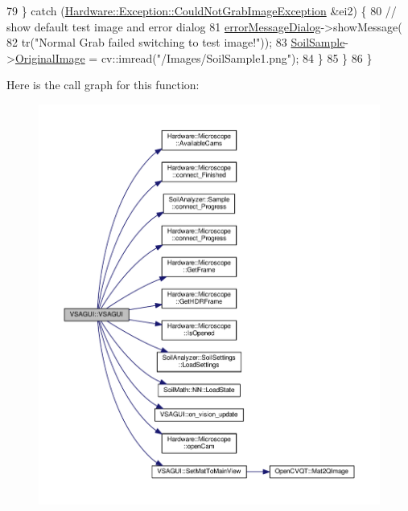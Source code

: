 \begin{DoxyCode}
79     \} \textcolor{keywordflow}{catch} (\hyperlink{class_hardware_1_1_exception_1_1_could_not_grab_image_exception}{Hardware::Exception::CouldNotGrabImageException}
       &ei2) \{
80       \textcolor{comment}{// show default test image and error dialog}
81       \hyperlink{class_v_s_a_g_u_i_af01408e987e5df2ce336ee8447841c1f}{errorMessageDialog}->showMessage(
82           tr(\textcolor{stringliteral}{"Normal Grab failed switching to test image!"}));
83       \hyperlink{class_v_s_a_g_u_i_ac90517c9baea0a75455d43d5eb77d3e7}{SoilSample}->\hyperlink{class_soil_analyzer_1_1_sample_a0d6e6fca9e232a77329daf0b4b29c634}{OriginalImage} = cv::imread(\textcolor{stringliteral}{"/Images/SoilSample1.png"});
84     \}
85   \}
86 \}
\end{DoxyCode}


Here is the call graph for this function\+:\nopagebreak
\begin{figure}[H]
\begin{center}
\leavevmode
\includegraphics[width=350pt]{class_v_s_a_g_u_i_a987a20380023fe5985bd1fef0491af40_cgraph}
\end{center}
\end{figure}


\hypertarget{class_v_s_a_g_u_i_ac68bb20d33069fc7f437e7daed3fcc0d}{}
